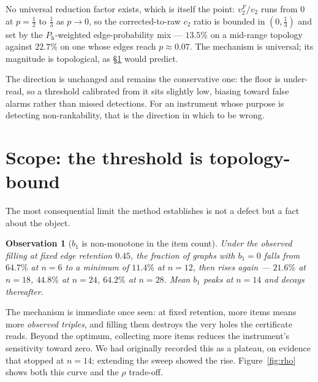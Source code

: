 \documentclass[11pt,a4paper]{article}
\newtheorem{observation}{Observation}
\newcommand{\Ph}{P_{\mathrm{h}}}
\begin{document}
No universal reduction factor exists, which is itself the point:
$v_2^F/v_2$ runs from $0$ at $p=\tfrac12$ to $\tfrac13$ as $p\to 0$, so the
corrected-to-raw $c_2$ ratio is bounded in $(0,\tfrac13)$ and set by the
$\Ph$-weighted edge-probability mix --- $13.5\%$ on a mid-range topology against
$22.7\%$ on one whose edges reach $p\approx0.07$. The mechanism is universal; its
magnitude is topological, as \S\ref{sec:scope} would predict.

The direction is unchanged and remains the conservative one: the floor is
under-read, so a threshold calibrated from it sits slightly low, biasing toward
false alarms rather than missed detections. For an instrument whose purpose is
detecting non-rankability, that is the direction in which to be wrong.

\section{Scope: the threshold is topology-bound}\label{sec:scope}

The most consequential limit the method establishes is not a defect but a fact
about the object.

\begin{observation}[$b_1$ is non-monotone in the item count]
Under the observed filling at fixed edge retention $0.45$, the fraction of
graphs with $b_1 = 0$ falls from $64.7\%$ at $n=6$ to a minimum of $11.4\%$ at
$n=12$, then \emph{rises} again --- $21.6\%$ at $n=18$, $44.8\%$ at $n=24$,
$64.2\%$ at $n=28$. Mean $b_1$ peaks at $n=14$ and decays thereafter.
\end{observation}

\noindent
The mechanism is immediate once seen: at fixed retention, more items means more
\emph{observed triples}, and filling them destroys the very holes the
certificate reads. Beyond the optimum, collecting more items reduces the
instrument's sensitivity toward zero. We had originally recorded this as a
plateau, on evidence that stopped at $n=14$; extending the sweep showed the
rise. Figure~\ref{fig:rho} shows both this curve and the $\rho$ trade-off.
\end{document}
